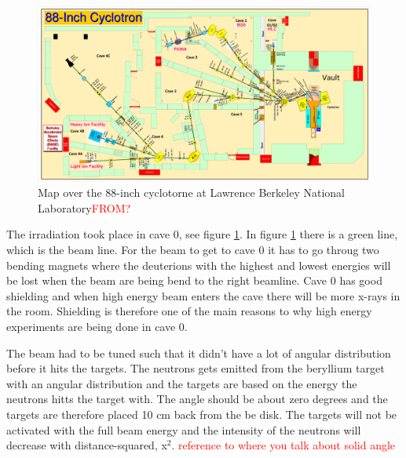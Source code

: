 \documentclass[twoside,english]{uiofysmaster/uiofysmaster}
\begin{document}
\begin{figure} [H]
   \centering
   \includegraphics[height=.6\textheight, angle=90]{Control-Room-Map.pdf}
   \caption{Map over the 88-inch cyclotorne at Lawrence Berkeley National Laboratory\textcolor{red}{FROM?}}
   \label{fig:Control-Room-Map}
\end{figure}
\noindent
The irradiation took place in cave 0, see figure \ref{fig:Control-Room-Map}. In figure \ref{fig:Control-Room-Map} there is a green line, which is the beam line. For the beam to get to cave 0 it has to go throug two bending magnets where the deuterions with the highest and lowest energies will be lost when the beam are being bend to the right beamline. Cave 0 has good shielding and when high energy beam enters the cave there will be more x-rays in the room. Shielding is therefore one of the main reasons to why high energy experiments are being done in cave 0.


The beam had to be tuned such that it didn't have a lot of angular distribution before it hits the targets. The neutrons gets emitted from the beryllium target with an angular distribution and the targets are based on the energy the neutrons hitts the target with. The angle should be about zero degrees and the targets are therefore placed 10 cm back from the be disk. The targets will not be activated with the full beam energy and the intensity of the neutrons will decrease with distance-squared, x$^2$. \textcolor{red}{reference to where you talk about solid angle}
\end{document}

